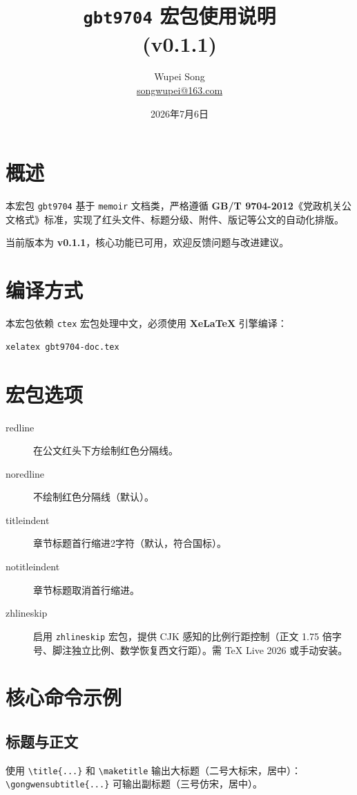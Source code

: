 \documentclass[redline, titleindent, zhlineskip]{gbt9704}
\title{\texttt{gbt9704} 宏包使用说明 \\ (v0.1.1)}
\author{Wupei Song \\ \small{\url{songwupei@163.com}}}
\date{2026年7月6日}
\begin{document}
\maketitle

\tableofcontents

\section{概述}
本宏包 \texttt{gbt9704} 基于 \texttt{memoir} 文档类，严格遵循 \textbf{GB/T 9704-2012}《党政机关公文格式》标准，实现了红头文件、标题分级、附件、版记等公文的自动化排版。

当前版本为 \textbf{v0.1.1}，核心功能已可用，欢迎反馈问题与改进建议。

\section{编译方式}
本宏包依赖 \texttt{ctex} 宏包处理中文，必须使用 \textbf{XeLaTeX} 引擎编译：
\begin{verbatim}
xelatex gbt9704-doc.tex
\end{verbatim}

\section{宏包选项}
\begin{description}
  \item[redline] 在公文红头下方绘制红色分隔线。
  \item[noredline] 不绘制红色分隔线（默认）。
  \item[titleindent] 章节标题首行缩进2字符（默认，符合国标）。
  \item[notitleindent] 章节标题取消首行缩进。
  \item[zhlineskip] 启用 \texttt{zhlineskip} 宏包，提供 CJK 感知的比例行距控制（正文 1.75 倍字号、脚注独立比例、数学恢复西文行距）。需 TeX Live 2026 或手动安装。
\end{description}

\section{核心命令示例}

\subsection{标题与正文}
使用 \verb|\title{...}| 和 \verb|\maketitle| 输出大标题（二号大标宋，居中）：
\verb|\gongwensubtitle{...}| 可输出副标题（三号仿宋，居中）。
\end{document}
